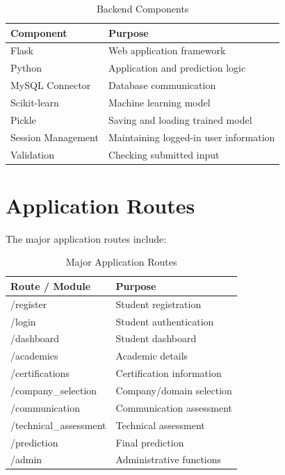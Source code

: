 \documentclass[12pt,a4paper]{report}
\begin{document}
\begin{table}[H]
\centering
\caption{Backend Components}

\begin{tabularx}{\textwidth}{p{}Y}
\toprule
\textbf{Component} & \textbf{Purpose} \\
\midrule
Flask & Web application framework \\
Python & Application and prediction logic \\
MySQL Connector & Database communication \\
Scikit-learn & Machine learning model \\
Pickle & Saving and loading trained model \\
Session Management & Maintaining logged-in user information \\
Validation & Checking submitted input \\
\bottomrule
\end{tabularx}
\end{table}

\section{Application Routes}

The major application routes include:

\begin{table}[H]
\centering
\caption{Major Application Routes}

\begin{tabularx}{\textwidth}{p{}Y}
\toprule
\textbf{Route / Module} & \textbf{Purpose} \\
\midrule
/register & Student registration \\
/login & Student authentication \\
/dashboard & Student dashboard \\
/academics & Academic details \\
/certifications & Certification information \\
/company\_selection & Company/domain selection \\
/communication & Communication assessment \\
/technical\_assessment & Technical assessment \\
/prediction & Final prediction \\
/admin & Administrative functions \\
\bottomrule
\end{tabularx}
\end{table}
\end{document}
